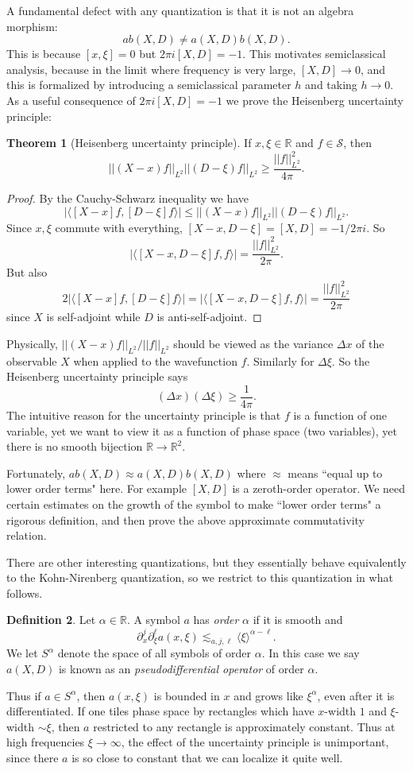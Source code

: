 \documentclass[12pt]{report}
\newcommand{\RR}{\mathbb{R}}
\newcommand{\Sch}{\mathcal{S}}
\newcommand{\dfn}[1]{\emph{#1}\index{#1}}
\theoremstyle{definition}
\newtheorem{theorem}{Theorem}[chapter]
\newtheorem{definition}[theorem]{Definition}
\begin{document}
A fundamental defect with any quantization is that it is not an algebra morphism:
$$ab(X, D) \neq a(X, D)b(X, D).$$
This is because $[x, \xi] = 0$ but $2\pi i[X, D] = -1$.
This motivates semiclassical analysis, because in the limit where frequency is very large, $[X, D] \to 0$, and this is formalized by introducing a semiclassical parameter $h$ and taking $h \to 0$.
As a useful consequence of $2\pi i[X, D] = -1$ we prove the Heisenberg uncertainty principle:
\begin{theorem}[Heisenberg uncertainty principle]
If $x,\xi \in \RR$ and $f \in \Sch$, then
$$||(X - x)f||_{L^2}||(D - \xi)f||_{L^2} \geq \frac{||f||_{L^2}^2}{4\pi}.$$
\end{theorem}
\begin{proof}
By the Cauchy-Schwarz inequality we have
$$|\langle [X - x]f, [D - \xi]f\rangle| \leq ||(X - x)f||_{L^2} ||(D - \xi)f||_{L^2}.$$
Since $x,\xi$ commute with everything, $[X - x, D - \xi] = [X, D] = -1/2\pi i$. So
$$|\langle [X - x, D - \xi]f, f\rangle| = \frac{||f||_{L^2}^2}{2\pi}.$$
But also
$$2|\langle [X - x]f, [D - \xi]f\rangle| = |\langle [X - x, D - \xi]f, f\rangle| = \frac{||f||_{L^2}^2}{2\pi}$$
since $X$ is self-adjoint while $D$ is anti-self-adjoint.
\end{proof}
Physically, $||(X-x)f||_{L^2}/||f||_{L^2}$ should be viewed as the variance $\Delta x$ of the observable $X$ when applied to the wavefunction $f$. Similarly for $\Delta \xi$. So the Heisenberg uncertainty principle says
$$(\Delta x)(\Delta \xi) \geq \frac{1}{4\pi}.$$
The intuitive reason for the uncertainty principle is that $f$ is a function of one variable, yet we want to view it as a function of phase space (two variables), yet there is no smooth bijection $\RR \to \RR^2$.

Fortunately, $ab(X, D) \approx a(X, D)b(X, D)$ where $\approx$ means ``equal up to lower order terms" here. For example $[X, D]$ is a zeroth-order operator.
We need certain estimates on the growth of the symbol to make ``lower order terms" a rigorous definition, and then prove the above approximate commutativity relation.

There are other interesting quantizations, but they essentially behave equivalently to the Kohn-Nirenberg quantization, so we restrict to this quantization in what follows.

\begin{definition}
Let $\alpha \in \RR$. A symbol $a$ has \dfn{order} $\alpha$ if it is smooth and
$$\partial_x^j\partial_\xi^\ell a(x, \xi) \lesssim_{a,j,\ell} \langle \xi \rangle^{\alpha - \ell}.$$
We let $S^\alpha$ denote the space of all symbols of order $\alpha$.
In this case we say $a(X, D)$ is known as an \dfn{pseudodifferential operator} of order $\alpha$.
\end{definition}
Thus if $a \in S^\alpha$, then $a(x, \xi)$ is bounded in $x$ and grows like $\xi^\alpha$, even after it is differentiated.
If one tiles phase space by rectangles which have $x$-width $1$ and $\xi$-width $\sim \xi$, then $a$ restricted to any rectangle is approximately constant.
Thus at high frequencies $\xi \to \infty$, the effect of the uncertainty principle is unimportant, since there $a$ is so close to constant that we can localize it quite well.
\end{document}
